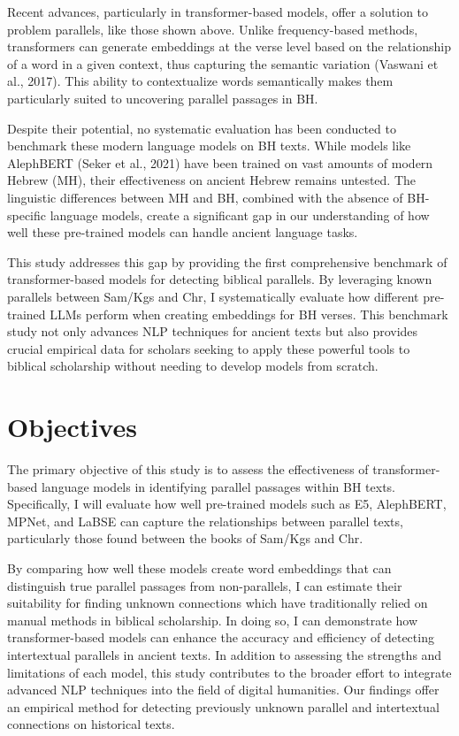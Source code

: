 \documentclass[12pt]{article}
\begin{document}
Recent advances, particularly in transformer-based models, offer a solution to problem parallels, like those shown above. Unlike frequency-based methods, transformers can generate embeddings at the verse level based on the relationship of a word in a given context, thus capturing the semantic variation (Vaswani et al., 2017). This ability to contextualize words semantically makes them particularly suited to uncovering parallel passages in BH.

Despite their potential, no systematic evaluation has been conducted to benchmark these modern language models on BH texts. While models like AlephBERT (Seker et al., 2021) have been trained on vast amounts of modern Hebrew (MH), their effectiveness on ancient Hebrew remains untested. The linguistic differences between MH and BH, combined with the absence of BH-specific language models, create a significant gap in our understanding of how well these pre-trained models can handle ancient language tasks.

This study addresses this gap by providing the first comprehensive benchmark of transformer-based models for detecting biblical parallels. By leveraging known parallels between Sam/Kgs and Chr, I systematically evaluate how different pre-trained LLMs perform when creating embeddings for BH verses. This benchmark study not only advances NLP techniques for ancient texts but also provides crucial empirical data for scholars seeking to apply these powerful tools to biblical scholarship without needing to develop models from scratch.

\section{Objectives}
The primary objective of this study is to assess the effectiveness of transformer-based language models in identifying parallel passages within BH texts. Specifically, I will evaluate how well pre-trained models such as E5, AlephBERT, MPNet, and LaBSE can capture the relationships between parallel texts, particularly those found between the books of Sam/Kgs and Chr.

By comparing how well these models create word embeddings that can distinguish true parallel passages from non-parallels, I can estimate their suitability for finding unknown connections which have traditionally relied on manual methods in biblical scholarship. In doing so, I can demonstrate how transformer-based models can enhance the accuracy and efficiency of detecting intertextual parallels in ancient texts. In addition to assessing the strengths and limitations of each model, this study contributes to the broader effort to integrate advanced NLP techniques into the field of digital humanities. Our findings offer an empirical method for detecting previously unknown parallel and intertextual connections on historical texts.
\end{document}
